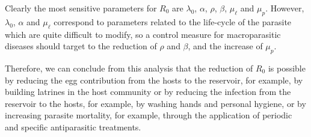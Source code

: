 \documentclass[eng]{MMSB-class-eng}
\begin{document}
{	Clearly the most sensitive parameters for $R_0$ are $\lambda_0$, $\alpha$, $\rho$, $\beta$, $\mu_{\ell}$ and $\mu_p$.
	However, $\lambda_0$, $\alpha$ and $\mu_{\ell}$ correspond to parameters related to the life-cycle of the parasite which are quite difficult to modify, so a control measure for macroparasitic diseases should target to the reduction of $\rho$ and $\beta$, and the increase of $\mu_p$.
	
	Therefore, we can conclude from this analysis that the reduction of $R_0$ 
	is possible by reducing the egg contribution from the hosts to the reservoir, for example, by building latrines in the host community 
	or by reducing the infection from the reservoir to the hosts, for example, by washing hands and personal hygiene,  
	or by increasing parasite mortality, for example, through the application of periodic and specific antiparasitic treatments.	
	
	
}
\end{document}
